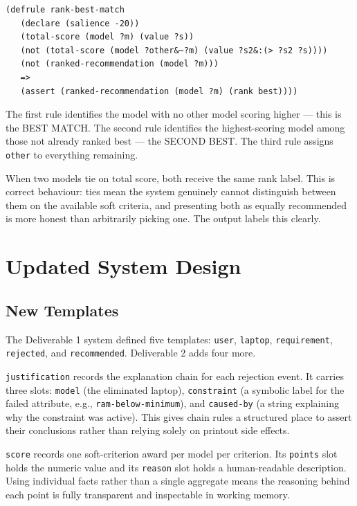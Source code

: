 \documentclass[12pt,a4paper]{article}
\begin{document}
\begin{lstlisting}[style=clips]
(defrule rank-best-match
   (declare (salience -20))
   (total-score (model ?m) (value ?s))
   (not (total-score (model ?other&~?m) (value ?s2&:(> ?s2 ?s))))
   (not (ranked-recommendation (model ?m)))
   =>
   (assert (ranked-recommendation (model ?m) (rank best))))
\end{lstlisting}

The first rule identifies the model with no other model scoring higher --- this is the BEST MATCH. The second rule identifies the highest-scoring model among those not already ranked best --- the SECOND BEST. The third rule assigns \texttt{other} to everything remaining.

When two models tie on total score, both receive the same rank label. This is correct behaviour: ties mean the system genuinely cannot distinguish between them on the available soft criteria, and presenting both as equally recommended is more honest than arbitrarily picking one. The output labels this clearly.

\section{Updated System Design}

\subsection{New Templates}

The Deliverable 1 system defined five templates: \texttt{user}, \texttt{laptop}, \texttt{requirement}, \texttt{rejected}, and \texttt{recommended}. Deliverable 2 adds four more.

\texttt{justification} records the explanation chain for each rejection event. It carries three slots: \texttt{model} (the eliminated laptop), \texttt{constraint} (a symbolic label for the failed attribute, e.g., \texttt{ram-below-minimum}), and \texttt{caused-by} (a string explaining why the constraint was active). This gives chain rules a structured place to assert their conclusions rather than relying solely on printout side effects.

\texttt{score} records one soft-criterion award per model per criterion. Its \texttt{points} slot holds the numeric value and its \texttt{reason} slot holds a human-readable description. Using individual facts rather than a single aggregate means the reasoning behind each point is fully transparent and inspectable in working memory.
\end{document}
